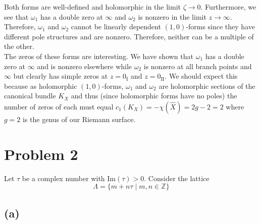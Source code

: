 \documentclass[12pt]{extarticle}
\newcommand{\Z}{\mathbb{Z}}
\renewcommand{\Im}[1]{\mathrm{Im}(#1)}
\theoremstyle{definition}
\begin{document}
Both forms are well-defined and holomorphic in the limit $\zeta \to 0$. Furthermore, we see that $\omega_1$ has a double zero at $\infty$ and $\omega_2$ is nonzero in the limit $z \to \infty$. Therefore, $\omega_1$ and $\omega_2$ cannot be linearly dependent $(1,0)$-forms since they have different pole structures and are nonzero. Therefore, neither can be a multiple of the other. 
\bigskip\\
The zeros of these forms are interesting. We have shown that $\omega_1$ has a double zero at $\infty$ and is nonzero elsewhere while $\omega_2$ is nonzero at all branch points and $\infty$ but clearly has simple zeros at $z = 0_{\mathrm{I}}$ and $z = 0_{\mathrm{II}}$. We should expect this because as holomorphic $(1,0)$-forms, $\omega_1$ and $\omega_2$ are holomorphic sections of the canonical bundle $K_X$ and thus (since holomorphic forms have no poles) the number of zeros of each must equal $c_1(K_X) = - \chi(\hat{X}) = 2 g - 2 = 2$ where $g = 2$ is the genus of our Riemann surface.   

\section*{Problem 2}

Let $\tau$ be a complex number with $\Im{\tau} > 0$. Consider the lattice
\[ \Lambda = \{ m + n \tau \mid m,n \in \Z \} \]

\subsection*{(a)}
\end{document}
